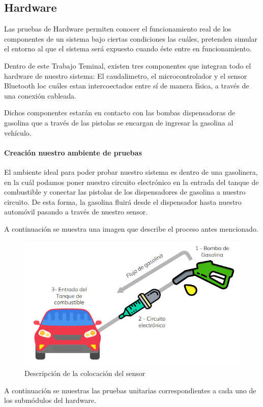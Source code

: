 \subsection{Hardware}

Las pruebas de Hardware permiten conocer el funcionamiento real de los componentes de un sistema bajo ciertas condiciones las cuáles, pretenden simular el entorno al que el sistema será expuesto cuando éste entre en funcionamiento.

Dentro de este Trabajo Teminal, existen tres componentes que integran todo el hardware de nuestro sistema: El caudalimetro, el microcontrolador y el sensor Bluetooth loc cuáles estan intercoectados entre sí de manera física, a través de una conexión cableada.

Dichos componentes estarán en contacto con las bombas dispensadoras de gasolina que a través de las pistolas se encargan de ingresar la gasolina al vehículo. 

\paragraph{Creación nuestro ambiente de pruebas}
El ambiente ideal para poder probar nuestro sistema es dentro de una gasolinera, en la cuál podamos poner nuestro circuito electrónico en la entrada del tanque de combustible y conectar las pistolas de los dispensadores de gasolina a nuestro circuito.
De esta forma, la gasolina fluirá desde el dispensador hasta nuestro automóvil pasando a través de nuestro sensor.

A continuación se muestra una imagen que describe el proceso antes mencionado.

\begin{figure}[H]
	\centering
	\includegraphics[scale=.60]{DocumentoTecnico/Capitulo6/images/flujo_uno}
	\caption{Descripción de la colocación del sensor}
	\label{fig:flujo_uno}
\end{figure}

A continuación se muestras las pruebas unitarias correspondientes a cada uno de los submódulos del hardware.


